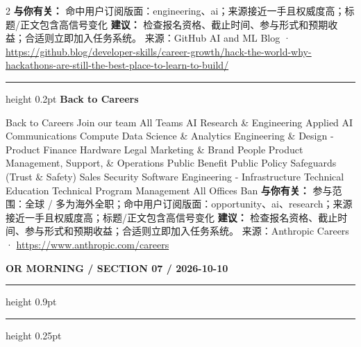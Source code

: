 \documentclass[10.5pt]{ctexart}
\begin{document}
\begin{multicols}{2}
\textbf{与你有关：} 命中用户订阅版面：engineering、ai；来源接近一手且权威度高；标题/正文包含高信号变化
\textbf{建议：} 检查报名资格、截止时间、参与形式和预期收益；合适则立即加入任务系统。
{\footnotesize\color{ormuted} 来源：GitHub AI and ML Blog · \url{https://github.blog/developer-skills/career-growth/hack-the-world-why-hackathons-are-still-the-best-place-to-learn-to-build/}}
\vspace{2mm}
\hrule height 0.2pt
\vspace{2mm}
{\large\bfseries Back to Careers}\par
Back to Careers Join our team All Teams AI Research \& Engineering Applied AI Communications Compute Data Science \& Analytics Engineering \& Design - Product Finance Hardware Legal Marketing \& Brand People Product Management, Support, \& Operations Public Benefit Public Policy Safeguards (Trust \& Safety) Sales Security Software Engineering - Infrastructure Technical Education Technical Program Management All Offices Ban
\textbf{与你有关：} 参与范围：全球 / 多为海外全职；命中用户订阅版面：opportunity、ai、research；来源接近一手且权威度高；标题/正文包含高信号变化
\textbf{建议：} 检查报名资格、截止时间、参与形式和预期收益；合适则立即加入任务系统。
{\footnotesize\color{ormuted} 来源：Anthropic Careers · \url{https://www.anthropic.com/careers}}
\end{multicols}
\newpage
{\small\bfseries OR MORNING / SECTION 07 / 2026-10-10}
\vspace{2mm}
\hrule height 0.9pt
\vspace{1.5mm}
\hrule height 0.25pt
\vspace{4mm}
\end{document}
